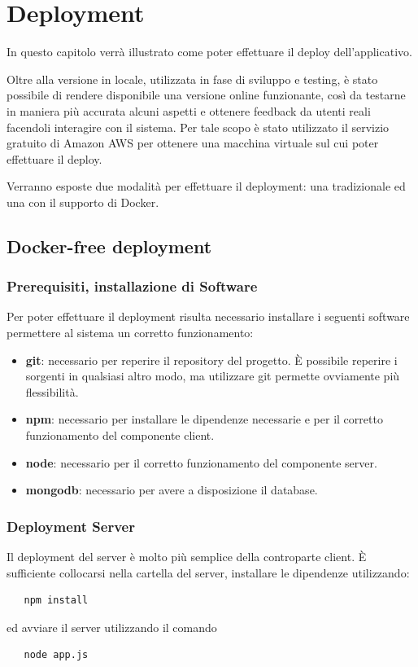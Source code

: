 \chapter{Deployment}
In questo capitolo verrà illustrato come poter effettuare il deploy dell'applicativo.\newline

\noindent Oltre alla versione in locale, utilizzata in fase di sviluppo e testing, è stato possibile di rendere disponibile una versione online funzionante, così da testarne in maniera più accurata alcuni aspetti e ottenere feedback da utenti reali facendoli interagire con il sistema. \newline
\noindent Per tale scopo è stato utilizzato il servizio gratuito di Amazon AWS per ottenere una macchina virtuale sul cui poter effettuare il deploy.\newline

\noindent Verranno esposte due modalità per effettuare il deployment: una tradizionale ed una con il supporto di Docker.

\section{Docker-free deployment}
\subsection{Prerequisiti, installazione di Software}
\noindent Per poter effettuare il deployment risulta necessario installare i seguenti software permettere al sistema un corretto funzionamento:
\begin{itemize}
    \item \textbf{git}: necessario per reperire il repository del progetto. È possibile reperire i sorgenti in qualsiasi altro modo, ma utilizzare git permette ovviamente più flessibilità.
    \item \textbf{npm}: necessario per installare le dipendenze necessarie e per il corretto funzionamento del componente client.
    \item \textbf{node}: necessario per il corretto funzionamento del componente server.
    \item \textbf{mongodb}: necessario per avere a disposizione il database.
\end{itemize}
\subsection{Deployment Server}
Il deployment del server è molto più semplice della controparte client. È sufficiente collocarsi nella cartella del server, installare le dipendenze utilizzando:
\begin{verbatim}
   npm install
\end{verbatim}
ed avviare il server utilizzando il comando 
\begin{verbatim}
   node app.js
\end{verbatim}

